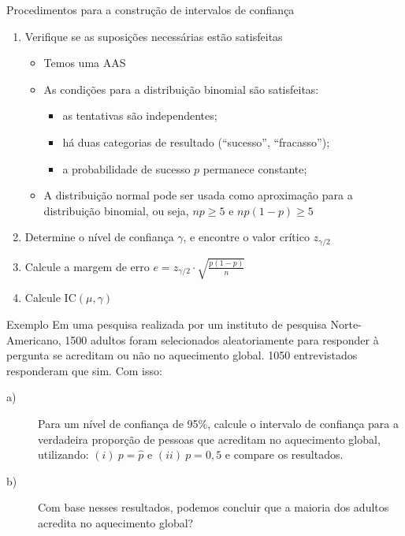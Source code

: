 \documentclass[14pt,aspectratio=1610]{beamer}
\begin{document}
\begin{frame}{Procedimentos para a construção de intervalos de confiança}
    \begin{block}{}
    \justifying
\begin{enumerate}
    \item Verifique se as suposições necessárias estão satisfeitas
    \begin{itemize}
        \item Temos uma AAS
        \item As condições para a distribuição binomial são satisfeitas:
        \begin{itemize}
            \item as tentativas são independentes;
            \item há duas categorias de resultado (``sucesso'', ``fracasso'');
            \item a probabilidade de sucesso $p$ permanece constante;
        \end{itemize}
        \item A distribuição normal pode ser usada como aproximação para a    distribuição binomial, ou seja, $np \geq 5$ e $np(1-p) \geq 5$
    \end{itemize}
   
    \item Determine o nível de confiança $\gamma$, e encontre o valor crítico $z_{\gamma/2}$
    \item Calcule a margem de erro $e = z_{\gamma/2} \cdot \sqrt{\frac{p(1-p)}{n}}$
    \item Calcule $\text{IC}(\mu, \gamma)$
\end{enumerate}   
    \end{block}
\end{frame}

\begin{frame}{}
    \begin{block}{Exemplo}
    \justifying
Em uma pesquisa realizada por um instituto de pesquisa Norte-Americano, 1500 adultos foram selecionados aleatoriamente para responder à pergunta se acreditam ou não no aquecimento global. 1050 entrevistados responderam que sim. Com isso:

\begin{description}
\item[a)~]Para um nível de confiança de 95\%, calcule o intervalo de confiança para a verdadeira proporção de pessoas que acreditam no aquecimento global, utilizando:
 $(i)\ p = \hat{p} \text{ e } (ii)\ p = 0,5$ e compare os resultados.
\item[b)~]Com base nesses resultados, podemos concluir que a maioria dos adultos acredita no aquecimento global?
\end{description}   
\end{block}
\end{frame}
\end{document}
